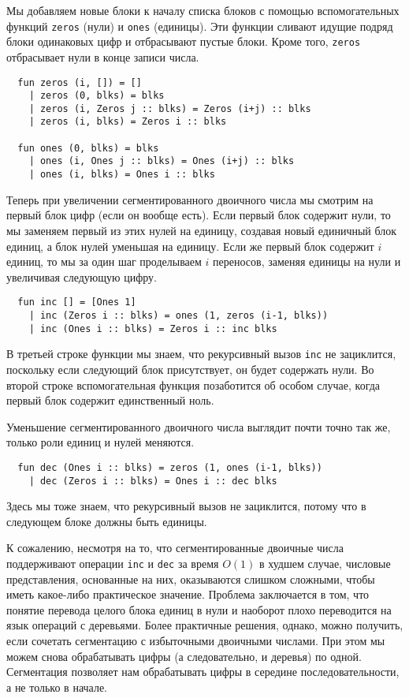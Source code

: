 Мы добавляем новые блоки к началу списка блоков с помощью
вспомогательных функций
\lstinline!zeros! (нули) и \lstinline!ones! (единицы). Эти функции
сливают идущие подряд блоки одинаковых цифр и отбрасывают
пустые блоки.  Кроме того, \lstinline!zeros! отбрасывает нули в конце
записи числа.
\begin{lstlisting}
  fun zeros (i, []) = []
    | zeros (0, blks) = blks
    | zeros (i, Zeros j :: blks) = Zeros (i+j) :: blks
    | zeros (i, blks) = Zeros i :: blks

  fun ones (0, blks) = blks
    | ones (i, Ones j :: blks) = Ones (i+j) :: blks
    | ones (i, blks) = Ones i :: blks
\end{lstlisting}
Теперь при увеличении сегментированного двоичного числа мы смотрим на
первый блок цифр (если он вообще есть). Если первый блок содержит
нули, то мы заменяем первый из этих нулей на единицу, создавая новый
единичный блок единиц, а блок нулей уменьшая на единицу. Если же
первый блок содержит $i$ единиц, то мы за один шаг проделываем $i$
переносов, заменяя единицы на нули и увеличивая следующую цифру.
\begin{lstlisting}
  fun inc [] = [Ones 1]
    | inc (Zeros i :: blks) = ones (1, zeros (i-1, blks))
    | inc (Ones i :: blks) = Zeros i :: inc blks
\end{lstlisting}
В третьей строке функции мы знаем, что рекурсивный вызов
\lstinline!inc! не зациклится, поскольку если следующий блок
присутствует, он будет содержать нули. Во второй строке
вспомогательная функция позаботится об особом случае, когда первый
блок содержит единственный ноль.

Уменьшение сегментированного двоичного числа выглядит почти точно так
же, только роли единиц и нулей меняются.
\begin{lstlisting}
  fun dec (Ones i :: blks) = zeros (1, ones (i-1, blks))
    | dec (Zeros i :: blks) = Ones i :: dec blks
\end{lstlisting}
Здесь мы тоже знаем, что рекурсивный вызов не зациклится, потому что в
следующем блоке должны быть единицы.

К сожалению, несмотря на то, что сегментированные двоичные числа
поддерживают операции \lstinline!inc! и \lstinline!dec! за время
$O(1)$ в худшем случае, числовые представления, основанные на них,
оказываются слишком сложными, чтобы иметь какое-либо практическое
значение. Проблема заключается в том, что понятие перевода целого
блока единиц в нули и наоборот плохо переводится на язык операций с
деревьями. Более практичные решения, однако, можно получить, если
сочетать сегментацию с избыточными двоичными числами. При этом мы
можем снова обрабатывать цифры (а следовательно, и деревья) по
одной. Сегментация позволяет нам обрабатывать цифры в середине
последовательности, а не только в начале.


